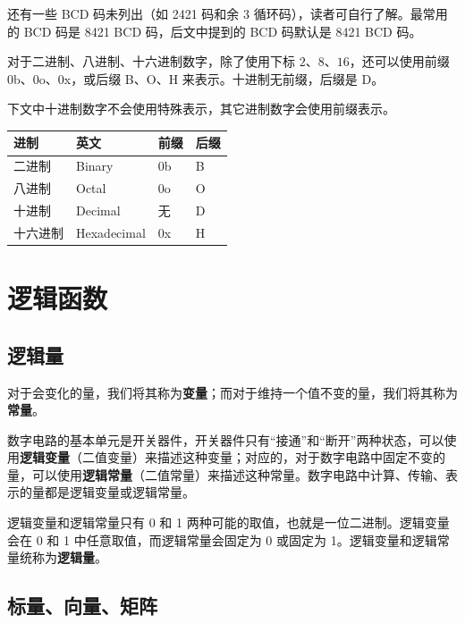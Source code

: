 \begin{remark}{}{}
  还有一些 BCD 码未列出（如 2421 码和余 3 循环码），读者可自行了解。最常用的 BCD 码是 8421 BCD 码，后文中提到的 BCD 码默认是 8421 BCD 码。
\end{remark}

\begin{note}{}{}
  对于二进制、八进制、十六进制数字，除了使用下标 $2$、$8$、$16$，还可以使用前缀 0b、0o、0x，或后缀 B、O、H 来表示。十进制无前缀，后缀是 D。
\end{note}

\begin{remark}{}{}
  下文中十进制数字不会使用特殊表示，其它进制数字会使用前缀表示。
\end{remark}

\begin{longtable}{|l|l|l|l|}
\hline
\textbf{进制} & \textbf{英文} & \textbf{前缀} & \textbf{后缀} \\ \hline
\endhead
二进制 & Binary & 0b & B \\ \hline
八进制 & Octal & 0o & O \\ \hline
十进制 & Decimal & 无 & D \\ \hline
十六进制 & Hexadecimal & 0x & H \\ \hline
\end{longtable}

\section{逻辑函数}

\subsection{逻辑量}

对于会变化的量，我们将其称为\textbf{变量}；而对于维持一个值不变的量，我们将其称为\textbf{常量}。

数字电路的基本单元是开关器件，开关器件只有“接通”和“断开”两种状态，可以使用\textbf{逻辑变量}（二值变量）来描述这种变量；对应的，对于数字电路中固定不变的量，可以使用\textbf{逻辑常量}（二值常量）来描述这种常量。数字电路中计算、传输、表示的量都是逻辑变量或逻辑常量。

逻辑变量和逻辑常量只有 0 和 1 两种可能的取值，也就是一位二进制。逻辑变量会在 0 和 1 中任意取值，而逻辑常量会固定为 0 或固定为 1。逻辑变量和逻辑常量统称为\textbf{逻辑量}。

\subsection{标量、向量、矩阵}

